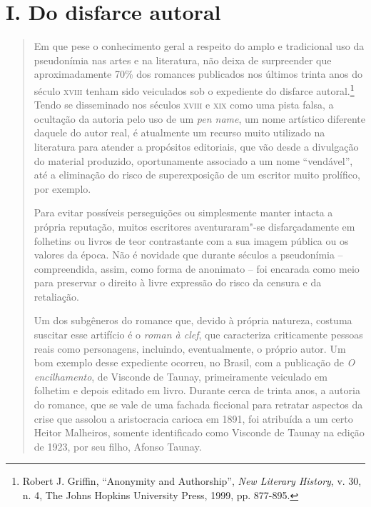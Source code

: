 

\section*{I. Do disfarce autoral}

\begin{quote}
Em que pese o conhecimento geral a respeito do amplo e tradicional uso
da pseudonímia nas artes e na literatura, não deixa de surpreender que
aproximadamente 70\% dos romances publicados nos últimos trinta anos do
século \textsc{xviii} tenham sido veiculados sob o expediente do
disfarce autoral.\footnote{Robert J. Griffin, ``Anonymity and
  Authorship'', \emph{New Literary History}, v. 30, n. 4, The Johns
  Hopkins University Press, 1999, pp. 877-895.} Tendo se disseminado nos
séculos \textsc{xviii} e \textsc{xix} como uma pista falsa, a ocultação
da autoria pelo uso de um \emph{pen name}, um nome artístico diferente
daquele do autor real, é atualmente um recurso muito utilizado na
literatura para atender a propósitos editoriais, que vão desde a
divulgação do material produzido, oportunamente associado a um nome
``vendável'', até a eliminação do risco de superexposição de um escritor
muito prolífico, por exemplo.

Para evitar possíveis perseguições ou simplesmente manter intacta a
própria reputação, muitos escritores aventuraram"-se disfarçadamente em
folhetins ou livros de teor contrastante com a sua imagem pública ou os
valores da época. Não é novidade que durante séculos a pseudonímia --
compreendida, assim, como forma de anonimato -- foi encarada como meio
para preservar o direito à livre expressão do risco da censura e da
retaliação.

Um dos subgêneros do romance que, devido à própria natureza, costuma
suscitar esse artifício é o \emph{roman à clef}, que caracteriza
criticamente pessoas reais como personagens, incluindo, eventualmente, o
próprio autor. Um bom exemplo desse expediente ocorreu, no Brasil, com a
publicação de \emph{O encilhamento}, de Visconde de Taunay,
primeiramente veiculado em folhetim e depois editado em livro. Durante
cerca de trinta anos, a autoria do romance, que se vale de uma fachada
ficcional para retratar aspectos da crise que assolou a aristocracia
carioca em 1891, foi atribuída a um certo Heitor Malheiros, somente
identificado como Visconde de Taunay na edição de 1923, por seu filho,
Afonso Taunay.


\end{quote}
